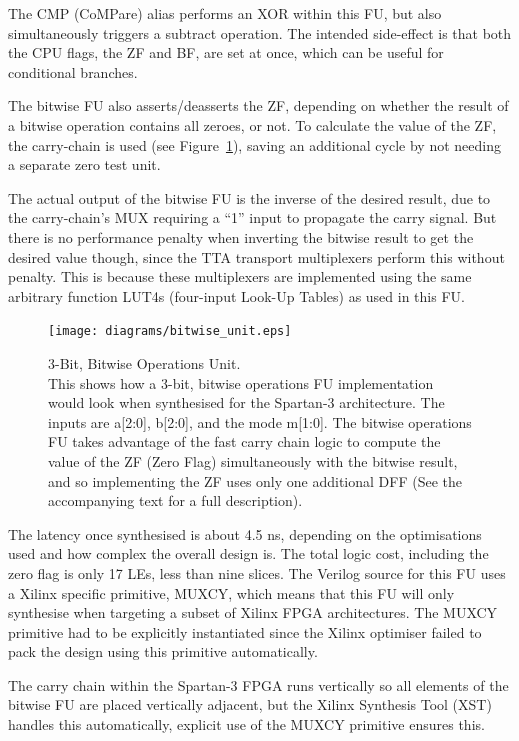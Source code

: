 The CMP (CoMPare) alias performs an XOR within this FU, but also simultaneously
triggers a subtract operation. The intended side-effect is that both the CPU
flags, the ZF and BF, are set at once, which can be useful for conditional
branches.

The bitwise FU also asserts/deasserts the ZF, depending on whether the result
of a bitwise operation contains all zeroes, or not. To calculate the value of
the ZF, the carry-chain is used (see Figure~\ref{CPU_Bitwise_Unit}), saving an
additional cycle by not needing a separate zero test unit.

The actual output of the bitwise FU is the inverse of the desired result, due to
the carry-chain's MUX requiring a ``1'' input to propagate the carry signal. But
there is no performance penalty when inverting the bitwise result to get the
desired value though, since the TTA transport multiplexers perform this without
penalty. This is because these multiplexers are implemented using the same
arbitrary function LUT4s (four-input Look-Up Tables) as used in this FU.

\begin{figure}[h!]
\begin{center}
\texttt{[image: diagrams/bitwise\_unit.eps]}
\caption[3-Bit, Bitwise Operations Unit]{3-Bit, Bitwise Operations Unit. \\
This shows how a 3-bit, bitwise operations FU implementation would look when
synthesised for the Spartan-3 architecture. The inputs are a[2:0], b[2:0],
and the mode m[1:0]. The bitwise operations FU takes advantage of the fast
carry chain logic to compute the value of the ZF (Zero Flag) simultaneously
with the bitwise result, and so implementing the ZF uses only one additional
DFF (See the accompanying text for a full description).}
\label{CPU_Bitwise_Unit}
\end{center}
\end{figure}

The latency once synthesised is about 4.5 ns, depending on the optimisations used
and how complex the overall design is. The total logic cost, including the zero
flag is only 17 LEs, less than nine slices. The Verilog source for this FU uses a
Xilinx specific primitive, MUXCY, which means that this FU will only synthesise
when targeting a subset of Xilinx FPGA architectures. The MUXCY primitive had to
be explicitly instantiated since the Xilinx optimiser failed to pack the design
using this primitive automatically.

The carry chain within the Spartan-3 FPGA runs vertically so all elements of the
bitwise FU are placed vertically adjacent, but the Xilinx Synthesis
Tool (XST) handles this
automatically, explicit use of the MUXCY primitive ensures this.

